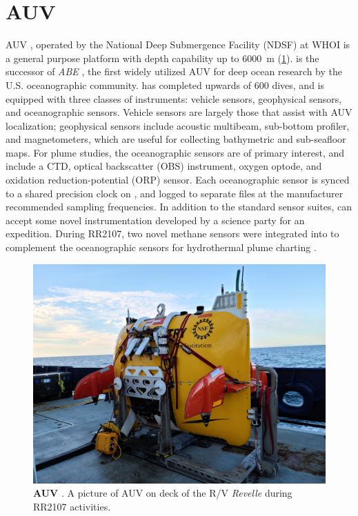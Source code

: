 \section{AUV \Sentry}
AUV \Sentry, operated by the National Deep Submergence Facility (NDSF) at WHOI \autocite{kaiser2016design} is a general purpose platform with depth capability up to \SI{6000}{\meter} (\cref{fig:ops_sentry}). \Sentry is the successor of \emph{ABE} \autocite{yoerger1991autonomous}, the first widely utilized AUV for deep ocean research by the U.S. oceanographic community. \Sentry has completed upwards of 600 dives, and is equipped with three classes of instruments: vehicle sensors, geophysical sensors, and oceanographic sensors. Vehicle sensors are largely those that assist with AUV localization; geophysical sensors include acoustic multibeam, sub-bottom profiler, and magnetometers, which are useful for collecting bathymetric and sub-seafloor maps. For plume studies, the oceanographic sensors are of primary interest, and include a CTD, optical backscatter (OBS) instrument, oxygen optode, and oxidation reduction-potential (ORP) sensor. Each oceanographic sensor is synced to a shared precision clock on \Sentry, and logged to separate files at the manufacturer recommended sampling frequencies. In addition to the standard sensor suites, \Sentry can accept some novel instrumentation developed by a science party for an expedition. During RR2107, two novel methane sensors were integrated into \Sentry to complement the oceanographic sensors for hydrothermal plume charting \autocite{michel2022gas,kapit2021dissolved,kapit2021measurement}.

\begin{figure}[h!]
  \centering
  \includegraphics[width=0.8\columnwidth]{figures/ops_sentry.jpg}
  \caption[AUV \Sentry]{\textbf{AUV \Sentry}. A picture of AUV \Sentry on deck of the R/V \emph{Revelle} during RR2107 activities.}
  \label{fig:ops_sentry}
\end{figure}

